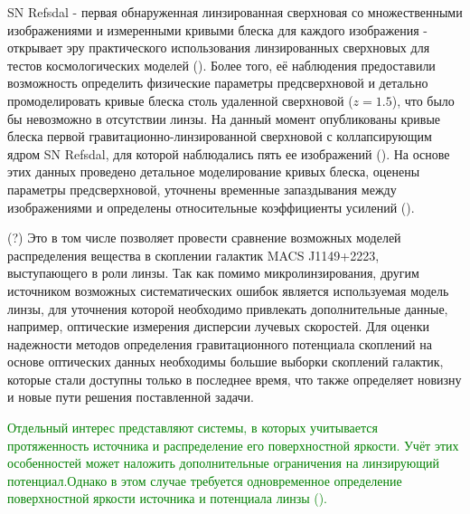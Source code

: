 SN Refsdal - первая обнаруженная линзированная сверхновая со множественными изображениями и измеренными кривыми блеска для каждого изображения - открывает эру практического использования линзированных сверхновых для тестов космологических моделей (\cite{grillo2018}). Более того, её наблюдения предоставили возможность определить физические параметры предсверхновой и детально промоделировать кривые блеска столь удаленной сверхновой ($z = 1.5$), что было бы невозможно в отсутствии линзы. На данный момент опубликованы кривые блеска первой гравитационно-линзированной сверхновой с коллапсирующим ядром SN Refsdal, для которой наблюдались пять ее изображений (\cite{rodney2016}). На основе этих данных проведено детальное моделирование кривых блеска, оценены параметры предсверхновой, уточнены временные запаздывания между изображениями и определены относительные коэффициенты усилений (\cite{petrnat2020}). 

(?) Это в том числе позволяет провести сравнение возможных моделей распределения вещества в скоплении галактик MACS J1149+2223, выступающего в роли линзы. Так как помимо микролинзирования, другим источником возможных систематических ошибок является используемая модель линзы, для уточнения которой необходимо привлекать дополнительные данные, например, оптические измерения дисперсии лучевых скоростей. Для оценки надежности методов определения гравитационного потенциала скоплений на основе оптических данных необходимы большие выборки скоплений галактик, которые стали доступны только в последнее время, что также определяет новизну и новые пути решения поставленной задачи.

\textcolor{green}{Отдельный интерес представляют системы, в которых учитывается протяженность источника и распределение его поверхностной яркости. Учёт этих особенностей может наложить дополнительные ограничения на линзирующий потенциал.Однако в этом случае требуется одновременное определение поверхностной яркости источника и потенциала линзы (\cite{suyu2010}).}